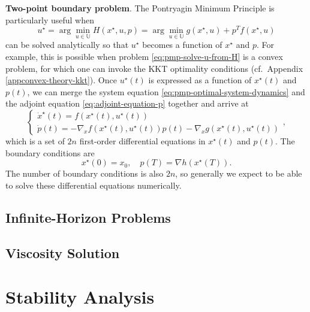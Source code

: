 \documentclass[
]{book}
\theoremstyle{definition}
\theoremstyle{definition}
\theoremstyle{definition}
\theoremstyle{definition}
\theoremstyle{remark}
\begin{document}
\textbf{Two-point boundary problem}. The Pontryagin Minimum Principle is particularly useful when
\begin{equation}
u^\star = \arg\min_{u \in \mathbb{U}} H(x^\star,u,p) = \arg\min_{u \in \mathbb{U}} g(x^\star,u) + p^T f(x^\star,u)
\label{eq:pmp-solve-u-from-H}
\end{equation}
can be solved analytically so that \(u^\star\) becomes a function of \(x^\star\) and \(p\). For example, this is possible when problem \eqref{eq:pmp-solve-u-from-H} is a convex problem, for which one can invoke the KKT optimality conditions (cf.~Appendix \ref{appconvex-theory-kkt}). Once \(u^\star(t)\) is expressed as a function of \(x^\star(t)\) and \(p(t)\), we can merge the system equation \eqref{eq:pmp-optimal-system-dynamics} and the adjoint equation \eqref{eq:adjoint-equation-p} together and arrive at
\begin{equation}
\begin{cases}
\dot{x}^\star(t) = f(x^\star(t), u^\star(t)) \\
\dot{p}(t) = - \nabla_x f(x^\star(t),u^\star(t)) p(t) - \nabla_x g(x^\star(t),u^\star(t))
\end{cases},
\label{eq:two-point-boundary-problem}
\end{equation}
which is a set of \(2n\) first-order differential equations in \(x^\star(t)\) and \(p(t)\). The boundary conditions are
\begin{equation}
x^\star(0) = x_0, \quad p(T) = \nabla h(x^\star(T)).
\label{eq:two-point-boundary-problem-boundary}
\end{equation}
The number of boundary conditions is also \(2n\), so generally we expect to be able to solve these differential equations numerically.

\hypertarget{infinite-horizon-problems}{%
\section{Infinite-Horizon Problems}\label{infinite-horizon-problems}}

\hypertarget{viscosity-solution}{%
\section{Viscosity Solution}\label{viscosity-solution}}

\hypertarget{stability}{%
\chapter{Stability Analysis}\label{stability}}
\end{document}
